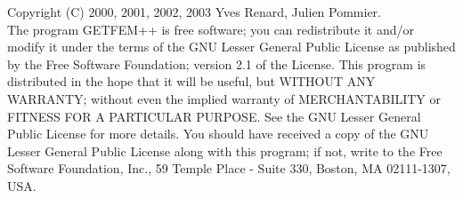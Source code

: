 Copyright (C) 2000, 2001, 2002, 2003 Yves Renard, Julien Pommier.\\
The program GETFEM++ is free software; you can redistribute it and/or modify
it under the terms of the GNU Lesser General Public License as published by
the Free Software Foundation; version 2.1 of the License.
This program is distributed in the hope that it will be useful,
but WITHOUT ANY WARRANTY; without even the implied warranty of
MERCHANTABILITY or FITNESS FOR A PARTICULAR PURPOSE.  See the
GNU Lesser General Public License for more details.
You should have received a copy of the GNU  Lesser General Public License
along with this program; if not, write to the Free Software Foundation,
Inc., 59 Temple Place - Suite 330, Boston, MA  02111-1307, USA.
